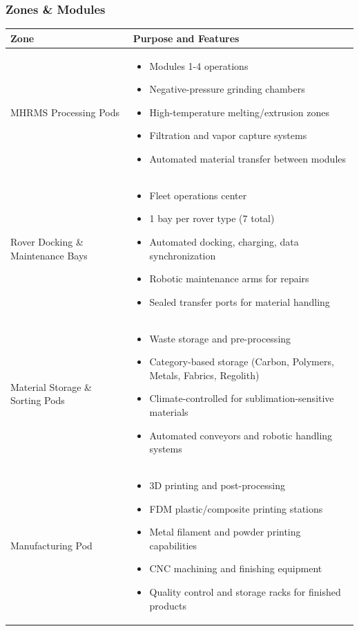 \documentclass[12pt, a4paper]{article}
\begin{document}
\subsubsection{Zones \& Modules}

\begin{table}[h!]
\centering
\small
\renewcommand{\arraystretch}{1.4}
\setlength{\tabcolsep}{8pt}
\begin{tabular}{p{} p{}}
\toprule
\textbf{Zone} & \textbf{Purpose and Features} \\
\midrule
MHRMS Processing Pods & 
\begin{itemize}
\setlength\itemsep{0.1em}
\item Modules 1-4 operations
\item Negative-pressure grinding chambers
\item High-temperature melting/extrusion zones
\item Filtration and vapor capture systems
\item Automated material transfer between modules
\end{itemize} \\[1em]

Rover Docking \& Maintenance Bays &
\begin{itemize}
\setlength\itemsep{0.1em}
\item Fleet operations center
\item 1 bay per rover type (7 total)
\item Automated docking, charging, data synchronization
\item Robotic maintenance arms for repairs
\item Sealed transfer ports for material handling
\end{itemize} \\[1em]

Material Storage \& Sorting Pods &
\begin{itemize}
\setlength\itemsep{0.1em}
\item Waste storage and pre-processing
\item Category-based storage (Carbon, Polymers, Metals, Fabrics, Regolith)
\item Climate-controlled for sublimation-sensitive materials
\item Automated conveyors and robotic handling systems
\end{itemize} \\[1em]

Manufacturing Pod &
\begin{itemize}
\setlength\itemsep{0.1em}
\item 3D printing and post-processing
\item FDM plastic/composite printing stations
\item Metal filament and powder printing capabilities
\item CNC machining and finishing equipment
\item Quality control and storage racks for finished products
\end{itemize} \\[1em]


\end{tabular}
\end{table}
\end{document}
